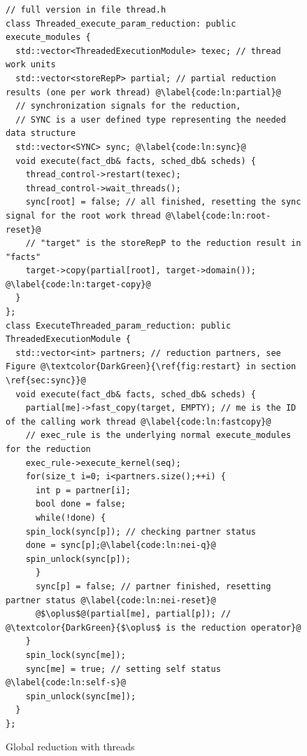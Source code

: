 \documentclass{article}
\begin{document}
\begin{figure}[h]
\begin{lstlisting}[escapechar=@]
// full version in file thread.h
class Threaded_execute_param_reduction: public execute_modules {
  std::vector<ThreadedExecutionModule> texec; // thread work units
  std::vector<storeRepP> partial; // partial reduction results (one per work thread) @\label{code:ln:partial}@
  // synchronization signals for the reduction, 
  // SYNC is a user defined type representing the needed data structure
  std::vector<SYNC> sync; @\label{code:ln:sync}@
  void execute(fact_db& facts, sched_db& scheds) {
    thread_control->restart(texec);
    thread_control->wait_threads();
    sync[root] = false; // all finished, resetting the sync signal for the root work thread @\label{code:ln:root-reset}@
    // "target" is the storeRepP to the reduction result in "facts"
    target->copy(partial[root], target->domain()); @\label{code:ln:target-copy}@
  }
};
class ExecuteThreaded_param_reduction: public ThreadedExecutionModule {
  std::vector<int> partners; // reduction partners, see Figure @\textcolor{DarkGreen}{\ref{fig:restart} in section \ref{sec:sync}}@
  void execute(fact_db& facts, sched_db& scheds) {
    partial[me]->fast_copy(target, EMPTY); // me is the ID of the calling work thread @\label{code:ln:fastcopy}@
    // exec_rule is the underlying normal execute_modules for the reduction
    exec_rule->execute_kernel(seq); 
    for(size_t i=0; i<partners.size();++i) {
      int p = partner[i];
      bool done = false;
      while(!done) {
	spin_lock(sync[p]); // checking partner status 
	done = sync[p];@\label{code:ln:nei-q}@
	spin_unlock(sync[p]);
      }
      sync[p] = false; // partner finished, resetting partner status @\label{code:ln:nei-reset}@
      @$\oplus$@(partial[me], partial[p]); // @\textcolor{DarkGreen}{$\oplus$ is the reduction operator}@
    }
    spin_lock(sync[me]);
    sync[me] = true; // setting self status @\label{code:ln:self-s}@
    spin_unlock(sync[me]);
  }
};
\end{lstlisting}
\caption{Global reduction with threads\label{fig:gr}}
\end{figure}
\end{document}
